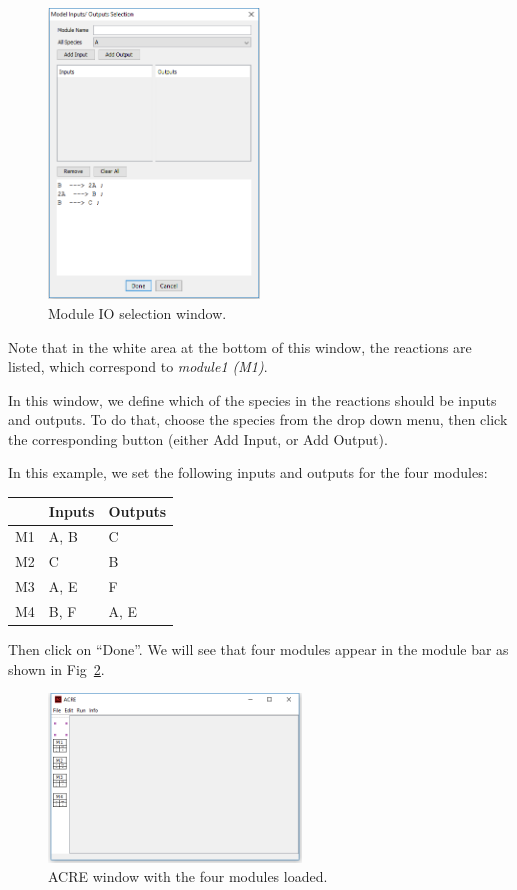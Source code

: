 \documentclass{report}
\begin{document}
\begin{figure}
	\centering
		\includegraphics[width=0.5\textwidth]{4}
	\caption{Module IO selection window.}
	\label{fig:4}
\end{figure}

Note that in the white area at the bottom of this window, the reactions are listed, which
correspond to \textit{module1 (M1)}.

In this window, we define which of the species in the reactions should be inputs and outputs. To
do that, choose the species from the drop down menu, then click the corresponding button
(either Add Input, or Add Output).

In this example, we set the following inputs and outputs for the four modules:

\begin{table}[]
\centering
\label{tab:1}
\begin{tabular}{|l|l|l|}
\hline
   & Inputs & Outputs \\ \hline
M1 & A, B   & C       \\ \hline
M2 & C      & B       \\ \hline
M3 & A, E   & F       \\ \hline
M4 & B, F   & A, E    \\ \hline
\end{tabular}
\end{table}

Then click on ``Done''. We will see that four modules appear in the module bar as shown in
Fig~\ref{fig:5}.

\begin{figure}
	\centering
		\includegraphics[width=0.6\textwidth]{5}
	\caption{ACRE window with the four modules loaded.}
	\label{fig:5}
\end{figure}
\end{document}

